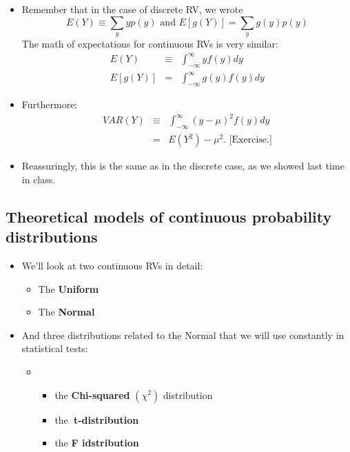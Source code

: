 \documentclass[11pt]{article}
\begin{document}
\begin{itemize}
\item Remember that in the case of discrete RV, we wrote%
\begin{equation*}
E(Y)\equiv \sum_{y}yp(y)\text{ \ and }E[g(Y)]=\sum_{y}g(y)p(y)
\end{equation*}%
The math of expectations for continuous RVs is very similar:%
\begin{eqnarray*}
E(Y) &\equiv &\int_{-\infty }^{\infty }yf(y)dy \\
E[g(Y)] &=&\int_{-\infty }^{\infty }g(y)f(y)dy
\end{eqnarray*}

\item Furthermore:%
\begin{eqnarray*}
VAR(Y) &\equiv &\int_{-\infty }^{\infty }(y-\mu )^{2}f(y)dy \\
&=&E(Y^{2})-\mu ^{2}.\text{ \ [Exercise.]}
\end{eqnarray*}

\item Reassuringly, this is the same as in the discrete case, as we showed
last time in class.
\end{itemize}

\subsection{Theoretical models of continuous probability distributions}

\begin{itemize}
\item We'll look at two continuous RVs in detail:

\begin{itemize}
\item The \textbf{Uniform}

\item The \textbf{Normal}
\end{itemize}

\item And three distributions related to the Normal that we will use
constantly in statistical tests:

\begin{itemize}
\item 
\begin{itemize}
\item the \textbf{Chi-squared} $\left( \chi ^{2}\right) $ distribution 

\item the\textbf{\ t-distribution} 

\item the \textbf{F idstribution}
\end{itemize}
\end{itemize}
\end{itemize}
\end{document}
